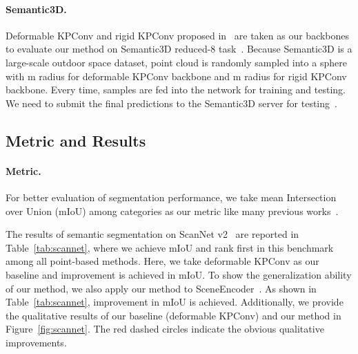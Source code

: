 \documentclass[final]{cvpr}
\begin{document}
\paragraph{Semantic3D.} Deformable KPConv and rigid KPConv proposed in~\cite{thomas2019kpconv} are taken as our backbones to evaluate our method on Semantic3D reduced-8 task~\cite{hackel2017semantic3d}. Because Semantic3D is a large-scale outdoor space dataset, point cloud is randomly sampled into a sphere with m radius for deformable KPConv backbone and m radius for rigid KPConv backbone. Every time,  samples are fed into the network for training and testing. We need to submit the final predictions to the Semantic3D server for testing~\cite{hackel2017semantic3d}.

\subsection{Metric and Results}
\label{subsec:result}
\paragraph{Metric.} For better evaluation of segmentation performance, we take mean Intersection over Union (mIoU) among categories as our metric like many previous works~\cite{gong2021boundary, qi2017pointnet, thomas2019kpconv}.

The results of semantic segmentation on ScanNet v2~\cite{dai2017scannet} are reported in Table~\ref{tab:scannet}, where we achieve  mIoU and rank first in this benchmark among all point-based methods. Here, we take deformable KPConv as our baseline and  improvement is achieved in mIoU. To show the generalization ability of our method, we also apply our method to SceneEncoder~\cite{xu2020sceneencoder}. As shown in Table~\ref{tab:scannet},  improvement in mIoU is achieved. Additionally, we provide the qualitative results of our baseline (deformable KPConv) and our method in Figure~\ref{fig:scannet}. The red dashed circles indicate the obvious qualitative improvements.
\end{document}

